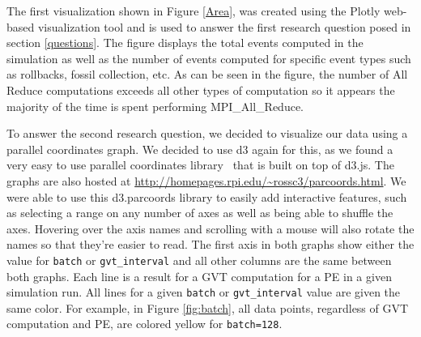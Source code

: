 \documentclass[12pt]{article}
\begin{document}
The first visualization shown in Figure \ref{Area}, was created using the Plotly web-based visualization tool and is used to answer the first research question posed in section \ref{questions}. The figure displays the total events computed in the simulation as well as the number of events computed for specific event types such as rollbacks, fossil collection, etc. As can be seen in the figure, the number of All Reduce computations exceeds all other types of computation so it appears the majority of the time is spent performing MPI\_All\_Reduce. 

To answer the second research question, we decided to visualize our data using a parallel coordinates graph.  We decided to use d3 again for this, as we found a very easy to use parallel coordinates library~\cite{Chang} that is built on top of d3.js.  The graphs are also hosted at \url{http://homepages.rpi.edu/~rossc3/parcoords.html}. We were able to use this d3.parcoords library to easily add interactive features, such as selecting a range on any number of axes as well as being able to shuffle the axes. Hovering over the axis names and scrolling with a mouse will also rotate the names so that they're easier to read.  The first axis in both graphs show either the value for \texttt{batch} or \texttt{gvt\_interval} and all other columns are the same between both graphs.  Each line is a result for a GVT computation for a PE in a given simulation run.  All lines for a given \texttt{batch} or \texttt{gvt\_interval} value are given the same color.  For example, in Figure \ref{fig:batch}, all data points, regardless of GVT computation and PE, are colored yellow for \texttt{batch=128}.
\end{document}
